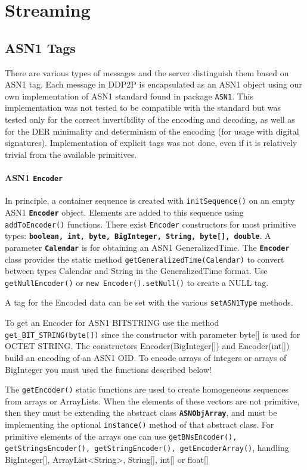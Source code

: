 \documentclass{book}
\newcommand{\pkg}[1]{{\tt #1}}
\newcommand{\cls}[1]{{\tt\bf #1}}
\newcommand{\mth}[1]{{\tt #1}}
\begin{document}
\section{Streaming}

\subsection{ASN1 Tags}
There are various types of messages and the server distinguish them based on ASN1 tag. Each message in DDP2P is
encapsulated as an ASN1 object using our own implementation of ASN1 standard found in package \pkg{ASN1}.
This implementation was not tested to be compatible with the standard but was tested only for the correct invertibility of the
encoding and decoding, as well as for the DER minimality and determinism of the encoding (for usage with digital signatures).
Implementation of explicit tags was not done, even if it is relatively trivial from the available primitives.

\paragraph{ASN1 \cls{Encoder}}
In principle, a container sequence is created with \mth{initSequence()} on an empty ASN1 \cls{Encoder} object.
Elements are added to this sequence using \mth{addToEncoder()} functions. There exist \mth{Encoder} constructors for
most primitive types: \cls{boolean, int, byte, BigInteger, String, byte[], double}. A parameter 
\cls{Calendar} is for obtaining an ASN1 GeneralizedTime. The \cls{Encoder} class provides the static method \mth{getGeneralizedTime(Calendar)}
to convert between types Calendar and String in the GeneralizedTime format.
Use \mth{getNullEncoder()} or \mth{new Encoder().setNull()} to create a NULL tag.


A tag for the Encoded data can be set with the various \mth{setASN1Type} methods.

To get an Encoder for ASN1 BITSTRING use the method \mth{get\_BIT\_STRING(byte[])} since the constructor
with parameter byte[] is used for OCTET STRING.
The constructors Encoder(BigInteger[]) and Encoder(int[]) build an encoding of an ASN1 OID. To encode
arrays of integers or arrays of BigInteger you must used the functions described below!

The \mth{getEncoder()} static functions are used to create homogeneous sequences from arrays or ArrayLists.
When the elements of these vectors are not primitive, then they must be extending the abstract class \cls{ASNObjArray},
and must be implementing the optional \mth{instance()} method of that abstract class.
For primitive elements of the arrays one can use \mth{getBNsEncoder(), getStringsEncoder(), getStringEncoder(), 
getEncoderArray()}, handling BigInteger[], ArrayList<String>, String[], int[] or float[]
\end{document}
